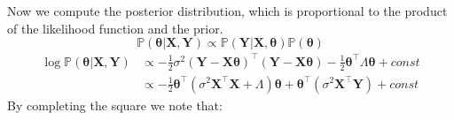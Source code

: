 \documentclass[twoside]{article}
\begin{document}
Now we compute the posterior distribution, which is proportional to the product of the likelihood function and the prior.
\begin{equation*}
    \mathbb{P}(\boldsymbol{\theta}| \boldsymbol{X}, \boldsymbol{Y}) \propto \mathbb{P}(\boldsymbol{Y}|\boldsymbol{X},\boldsymbol{\theta}) \mathbb{P}(\boldsymbol{\theta})
\end{equation*}
\begin{equation*}
\begin{aligned}
    \log\mathbb{P}(\boldsymbol{\theta}| \boldsymbol{X}, \boldsymbol{Y}) &\propto -\frac{1}{2}\sigma^2(\boldsymbol{Y} - \boldsymbol{X}\boldsymbol{\theta})^\intercal(\boldsymbol{Y} - \boldsymbol{X}\boldsymbol{\theta}) - \frac{1}{2}\boldsymbol{\theta}^\intercal\Lambda\boldsymbol{\theta} + const\\
    &\propto -\frac{1}{2}\boldsymbol{\theta}^\intercal(\sigma^2\boldsymbol{X}^\intercal\boldsymbol{X} + \Lambda)\boldsymbol{\theta} + \boldsymbol{\theta}^\intercal(\sigma^2\boldsymbol{X}^\intercal\boldsymbol{Y}) + const
\end{aligned}
\end{equation*}
By completing the square we note that:
\end{document}
